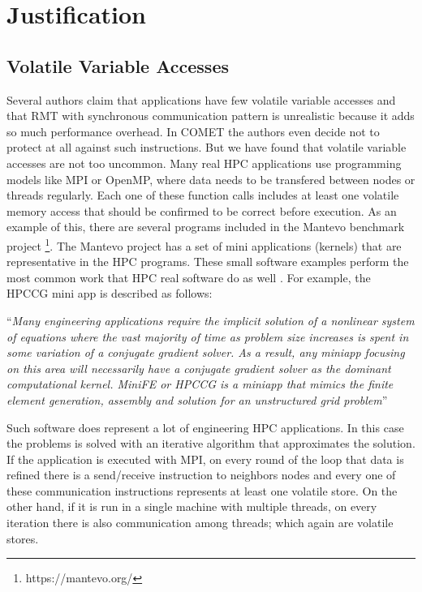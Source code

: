 \section{Justification}
\label{sec:justification}

\subsection{Volatile Variable Accesses}
\label{subsubsec:volatileAccesses}
Several authors \cite{mitropoulou2016comet} \cite{wang2007compiler} \cite{zhang2012daft}  claim that applications have few volatile variable accesses and that RMT with synchronous communication pattern is unrealistic because it adds so much performance overhead. In COMET the authors even decide not to protect at all against such instructions. But we have found that volatile variable accesses are not too uncommon. Many real HPC applications use programming models like MPI or OpenMP, where data needs to be transfered between nodes or threads regularly. Each one of these function calls includes at least one volatile memory access that should be confirmed to be correct before execution. As an example of this, there are several programs included in the Mantevo benchmark project \footnote{https://mantevo.org/}. The Mantevo project has a set of mini applications (kernels) that are representative in the HPC programs. These small software examples perform the most common work that HPC real software do as well \cite{heroux2009improvingMantevo}. For example, the HPCCG mini app is described as follows: 

``\emph{Many engineering applications require the implicit solution of a nonlinear system of equations where the vast majority of time as problem size increases is spent in some variation of a conjugate gradient solver. As a result, any miniapp focusing on this area will necessarily have a conjugate gradient solver as the dominant computational kernel. MiniFE or HPCCG is a miniapp that mimics the finite element generation, assembly and solution for an unstructured grid problem}''

Such software does represent a lot of engineering HPC applications. In this case the problems is solved with an iterative algorithm that approximates the solution. If the application is executed with MPI, on every round of the loop that data is refined there is a send/receive instruction to neighbors nodes and every one of these communication instructions represents at least one volatile store. On the other hand, if it is run in a single machine with multiple threads, on every iteration there is also communication among threads; which again are volatile stores. 

